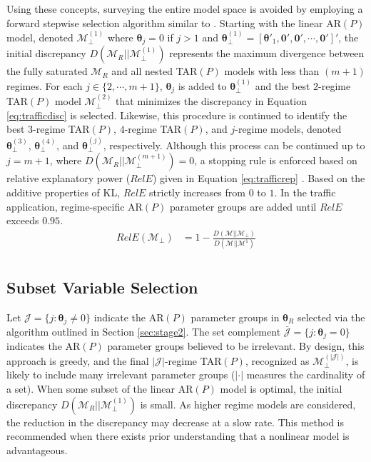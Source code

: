 Using these concepts, surveying the entire model space is avoided by employing a forward stepwise selection algorithm similar to \cite{Piironen2015}. Starting with the linear AR$(P)$ model, denoted $\mathcal{M}^{(1)}_{\perp}$ where $\bm{\theta}_j=0$ if $j>1$ and $\bm{\theta}^{(1)}_\perp=[\bm{\theta}'_1,\bm{0}',\bm{0}',\cdots,\bm{0}']'$, the initial discrepancy $D(\mathcal{M}_{R}||\mathcal{M}^{(1)}_{\perp})$ represents the maximum divergence between the fully saturated $\mathcal{M}_R$ and all nested TAR$(P)$ models with less than $(m+1)$ regimes. For each $j \in \{2,\cdots,m+1\}$, $\bm{\theta}_j$ is added to $\bm{\theta}^{(1)}_\perp$ and the best $2$-regime TAR$(P)$ model $\mathcal{M}^{(2)}_\perp$ that minimizes the discrepancy in Equation \ref{eq:trafficdisc} is selected. Likewise, this procedure is continued to identify the best $3$-regime TAR$(P)$, $4$-regime TAR$(P)$, and $j$-regime models, denoted $\bm{\theta}^{(3)}_\perp$, $\bm{\theta}^{(4)}_\perp$, and $\bm{\theta}^{(j)}_\perp$, respectively. Although this process can be continued up to $j=m+1$, where 
$D(\mathcal{M}_{R}||\mathcal{M}^{(m+1)}_{\perp})=0$, a stopping rule is enforced based on relative explanatory power ($RelE$) given in Equation \ref{eq:trafficrep} \citep{Dupuis2003}. Based on the additive properties of KL, $RelE$ strictly increases from $0$ to $1$. In the traffic application, regime-specific AR$(P)$ parameter groups are added until $RelE$ exceeds $0.95$.
\begin{equation}
\label{eq:trafficrep}
\begin{split}
RelE(\mathcal{M}_\perp)&=1-\frac{D(\mathcal{M}||\mathcal{M}_\perp)}{D(\mathcal{M}||\mathcal{M}^1)}\\
\end{split}
\end{equation}


\subsection{Subset Variable Selection}
\label{sec:stage3}

Let $\mathcal{J}=\{j: \bm{\theta}_j \neq 0\}$ indicate the AR$(P)$ parameter groups in $\bm{\theta}_R$ selected via the algorithm outlined in Section \ref{sec:stage2}. The set complement $\bar{\mathcal{J}}=\{j: \bm{\theta}_j = 0\}$ indicates the AR$(P)$ parameter groups believed to be irrelevant. By design, this approach is greedy, and the final $|\mathcal{J}|$-regime TAR$(P)$, recognized as $\mathcal{M}^{(|\mathcal{J}|)}_\perp$, is likely to include many irrelevant parameter groups ($|\cdot|$ measures the cardinality of a set). When some subset of the linear AR$(P)$ model is optimal, the initial discrepancy  $D(\mathcal{M}_{R}||\mathcal{M}^{(1)}_{\perp})$ is small. As higher regime models are considered, the reduction in the discrepancy may decrease at a slow rate. This method is recommended when there exists prior understanding that a nonlinear model is advantageous.

